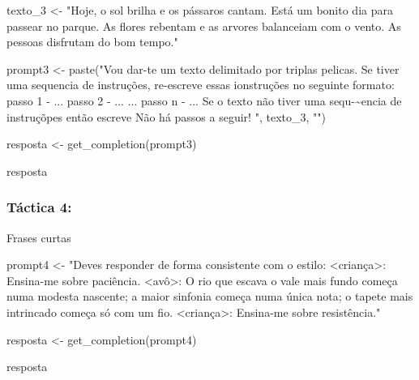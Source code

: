 \documentclass[
  letterpaper,
  paper=6in:9in,
  pagesize=pdftex,
  headinclude=on,
  footinclude=on,
  12pt]{scrbook}
\newenvironment{Shaded}{\begin{snugshade}}{\end{snugshade}}
\newcommand{\FunctionTok}[1]{\textcolor[rgb]{0.28,0.35,0.67}{#1}}
\newcommand{\NormalTok}[1]{\textcolor[rgb]{0.00,0.23,0.31}{#1}}
\newcommand{\OtherTok}[1]{\textcolor[rgb]{0.00,0.23,0.31}{#1}}
\newcommand{\StringTok}[1]{\textcolor[rgb]{0.13,0.47,0.30}{#1}}
\begin{document}
\begin{Shaded}
\begin{Highlighting}[]
\NormalTok{texto\_3 }\OtherTok{\textless{}{-}} \StringTok{"Hoje, o sol brilha e os pássaros cantam. Está um bonito dia para passear no parque. }
\StringTok{As flores rebentam e as arvores balanceiam com o vento. As pessoas disfrutam do bom tempo."}

\NormalTok{prompt3 }\OtherTok{\textless{}{-}} \FunctionTok{paste}\NormalTok{(}\StringTok{"Vou dar{-}te um texto delimitado por triplas pelicas. Se tiver uma sequencia de instruções, re{-}escreve essas ionstruções no seguinte formato:}
\StringTok{                 passo 1 {-} ...}
\StringTok{                 passo 2 {-} ...}
\StringTok{                 ...}
\StringTok{                 passo n {-} ...}
\StringTok{                 Se o texto não tiver uma sequ{-}\textasciitilde{}encia de instruçõpes então escreve \textquotesingle{}Não há passos a seguir!\textquotesingle{}}
\StringTok{                 \textquotesingle{}\textquotesingle{}\textquotesingle{} "}\NormalTok{, texto\_3, }\StringTok{"\textquotesingle{}\textquotesingle{}\textquotesingle{}"}\NormalTok{)}

\NormalTok{resposta }\OtherTok{\textless{}{-}} \FunctionTok{get\_completion}\NormalTok{(prompt3)}

\NormalTok{resposta}
\end{Highlighting}
\end{Shaded}

\hypertarget{tuxe1ctica-4}{%
\subsubsection{Táctica 4:}\label{tuxe1ctica-4}}

Frases curtas

\begin{Shaded}
\begin{Highlighting}[]
\NormalTok{prompt4 }\OtherTok{\textless{}{-}} \StringTok{"Deves responder de forma consistente com o estilo:}
\StringTok{\textless{}criança\textgreater{}: Ensina{-}me sobre paciência.}
\StringTok{\textless{}avô\textgreater{}: O rio que escava o vale mais fundo começa numa modesta nascente; }
\StringTok{a maior sinfonia começa numa única nota; o tapete mais intrincado começa só com um fio.}
\StringTok{\textless{}criança\textgreater{}: Ensina{-}me sobre resistência."}

\NormalTok{resposta }\OtherTok{\textless{}{-}} \FunctionTok{get\_completion}\NormalTok{(prompt4)}

\NormalTok{resposta}
\end{Highlighting}
\end{Shaded}
\end{document}
